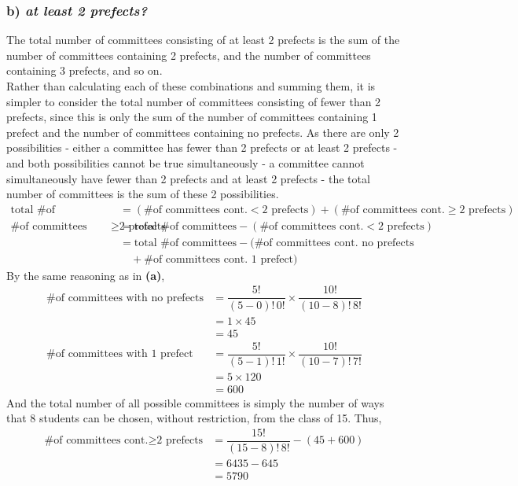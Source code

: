 \documentclass{article}
\begin{document}
\subsubsection*{b) {\em at least 2 prefects?}}
The total number of committees consisting of at least 2 prefects is the sum of the number of committees containing 2 prefects, and the number of committees containing 3 prefects, and so on.\\[1ex]
Rather than calculating each of these combinations and summing them, it is simpler to consider the total number of committees consisting of fewer than 2 prefects, since this is only the sum of the number of committees containing 1 prefect and the number of committees containing no prefects. As there are only 2 possibilities - either a committee has fewer than 2 prefects or at least 2 prefects - and both possibilities cannot be true simultaneously - a committee cannot simultaneously have fewer than 2 prefects and at least 2 prefects - the total number of committees is the sum of these 2 possibilities.
\begin{align*}
\text{total \# of committees}& =\left(\text{\# of committees cont.}<\text{2 prefects}\right)+
\left(\text{\# of committees cont.}\geq\text{2 prefects}\right)\\
\text{\# of committees cont.}\geq\text{2 prefects}& =\text{total \# of committees}-\left(\text{\# of committees cont.}<\text{2 prefects}\right)\\
& =\text{total \# of committees}-(\text{\# of committees cont. no prefects}\\
& \quad+\text{\# of committees cont. 1 prefect})
\end{align*}
By the same reasoning as in \textbf{(a)},
\begin{align*}
\text{\# of committees with no prefects}& =\dfrac{5!}{(5-0)!\,0!}\times\dfrac{10!}{(10-8)!\,8!}\\
& =1\times 45\\
& =45\\
\text{\# of committees with 1 prefect}& =\dfrac{5!}{(5-1)!\,1!}\times\dfrac{10!}{(10-7)!\,7!}\\
& =5\times 120\\
& =600
\end{align*}
And the total number of all possible committees is simply the number of ways that 8 students can be chosen, without restriction, from the class of 15. Thus,
\begin{align*}
\text{\# of committees cont.}\geq\text{2 prefects}& =\dfrac{15!}{(15-8)!\,8!}-\left(45+600\right)\\
& =6435-645\\
& =5790
\end{align*}
\end{document}
